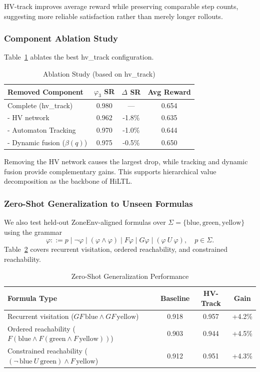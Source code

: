 \documentclass[conference]{IEEEtran}
\begin{document}
HV-track improves average reward while preserving comparable step counts, suggesting more reliable satisfaction rather than merely longer rollouts.

\subsubsection{Component Ablation Study}
\label{app:ablation}

Table~\ref{tab:ablation} ablates the best hv\_track configuration.

\begin{table}[h]
\centering
\caption{Ablation Study (based on hv\_track)}
\label{tab:ablation}
\begin{tabular}{@{}lccc@{}}
	\toprule
	\textbf{Removed Component} & \textbf{$\varphi_3$ SR} & \textbf{$\Delta$ SR} & \textbf{Avg Reward} \\ \midrule
Complete (hv\_track) & 0.980 & --- & 0.654 \\
- HV network & 0.962 & -1.8\% & 0.635 \\
- Automaton Tracking & 0.970 & -1.0\% & 0.644 \\
- Dynamic fusion ($\beta(q)$) & 0.975 & -0.5\% & 0.650 \\ \bottomrule
\end{tabular}
\end{table}

Removing the HV network causes the largest drop, while tracking and dynamic fusion provide complementary gains. This supports hierarchical value decomposition as the backbone of HiLTL.

\subsubsection{Zero-Shot Generalization to Unseen Formulas}
\label{app:generalization}

We also test held-out ZoneEnv-aligned formulas over $\Sigma=\{\text{blue},\text{green},\text{yellow}\}$ using the grammar
\[
\varphi ::= p \mid \neg\varphi \mid (\varphi\land\varphi) \mid F\varphi \mid G\varphi \mid (\varphi\ U\ \varphi),\quad p\in\Sigma.
\]
Table~\ref{tab:zero_shot_gen} covers recurrent visitation, ordered reachability, and constrained reachability.

\begin{table}[h]
\centering
\caption{Zero-Shot Generalization Performance}
\label{tab:zero_shot_gen}
\begin{tabular}{@{}lccc@{}}
	\toprule
	\textbf{Formula Type} & \textbf{Baseline} & \textbf{HV-Track} & \textbf{Gain} \\ \midrule
Recurrent visitation ($G F\,\text{blue}\land G F\,\text{yellow}$) & 0.918 & 0.957 & +4.2\% \\
Ordered reachability ($F(\text{blue}\land F(\text{green}\land F\,\text{yellow}))$) & 0.903 & 0.944 & +4.5\% \\
Constrained reachability ($(\neg\,\text{blue}\ U\ \text{green})\land F\,\text{yellow}$) & 0.912 & 0.951 & +4.3\% \\ \bottomrule
\end{tabular}
\end{table}
\end{document}
